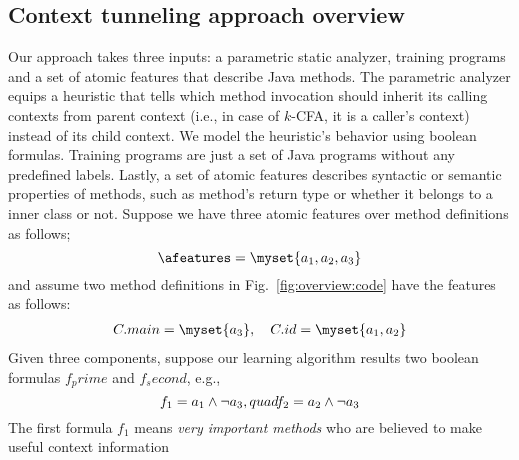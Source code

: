 \subsection{Context tunneling approach overview}
Our approach takes three inputs: a parametric static analyzer, training programs and a set of atomic features that describe Java methods. The parametric analyzer equips a heuristic that tells which method invocation should inherit its calling contexts from parent context (i.e., in case of $k$-CFA, it is a caller's context) instead of its child context. We model the heuristic's behavior using boolean formulas. Training programs are just a set of Java programs without any predefined labels. Lastly, a set of atomic features describes syntactic or semantic properties of methods, such as method's return type or whether it belongs to a inner class or not. Suppose we have three atomic features over method definitions as follows;
\[
\afeatures=\myset{a_1, a_2, a_3}
\]
and assume two method definitions in Fig.~\ref{fig:overview:code} have the features as follows:
\begin{align}
  C.main=\myset{a_3}, \quad C.id=\myset{a_1, a_2}
\end{align}
Given three components, suppose our learning algorithm results two boolean formulas $f_prime$ and $f_second$, e.g.,
\[
f_1=a_1 \wedge \neg a_3, \\quad f_2=a_2\wedge \neg a_3 
\]
The first formula $f_1$ means \emph{very important methods} who are believed to make useful context information







